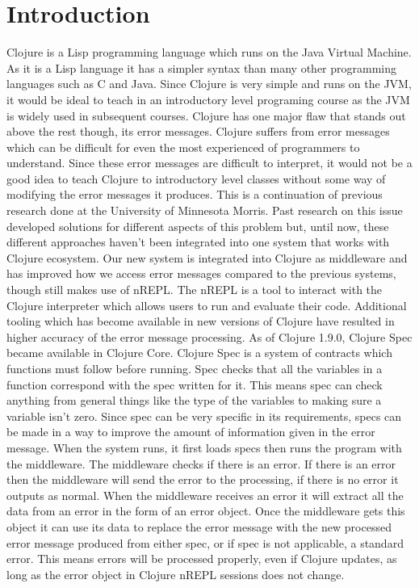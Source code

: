 \documentclass[12pt]{article}
\newcommand{\comment}[1]{{\bf \tt  {#1}}}
\newcommand{\emcomment}[1]{\textcolor{ForestGreen}{\comment{Elena: {#1}}}}
\begin{document}
\section{Introduction}
Clojure is a Lisp programming language which runs on the Java Virtual Machine. As it is a Lisp language it has a simpler syntax than many other programming languages such as C and Java. Since Clojure is very simple and runs on the JVM, it would be ideal to teach in an introductory level programing course as the JVM is widely used in subsequent courses. Clojure has one major flaw that stands out above the rest though, its error messages. Clojure suffers from error messages which can be difficult for even the most experienced of programmers to understand. Since these error messages are difficult to interpret, it would not be a good idea to teach Clojure to introductory level classes without some way of modifying the error messages it produces. 
This is a continuation of previous research done at the University of Minnesota Morris. Past research on this issue developed solutions for different aspects of this problem but, until now, these different approaches haven’t been integrated into one system that works with Clojure ecosystem. Our new system is integrated into Clojure as middleware and has improved how we access error messages compared to the previous systems, though still makes use of nREPL. The nREPL is a tool to interact with the Clojure interpreter which allows users to run and evaluate their code. Additional tooling which has become available in new versions of Clojure have resulted in higher accuracy of the error message processing. 
As of Clojure 1.9.0, Clojure Spec became available in Clojure Core. Clojure Spec is a system of contracts which functions must follow before running. Spec checks that all the variables in a function correspond with the spec written for it. This means spec can check anything from general things like the type of the variables to making sure a variable isn’t zero. Since spec can be very specific in its requirements, specs can be made in a way to improve the amount of information given in the error message. 
When the system runs, it first loads specs then runs the program with the middleware. The middleware checks if there is an error. If there is an error then the middleware will send the error to the processing, if there is no error it outputs as normal. When the middleware receives an error it will extract all the data from an error in the form of an error object. Once the middleware gets this object it can use its data to replace the error message with the new processed error message produced from either spec, or if spec is not applicable, a standard error. This means errors will be processed properly, even if Clojure updates, as long as the error object in Clojure nREPL sessions does not change.  
\end{document}
